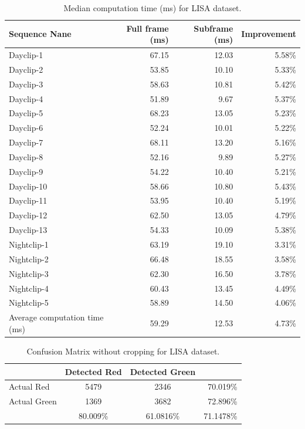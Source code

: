 \begin{table}[!ht]
  \centering
  \caption{Median computation time (ms) for LISA dataset.}
  \label{t:lisa_time}
  \begin{tabular}{  l   r   r  r}
    \rowcolor{gray!50}
    Sequence Nane &  Full frame (ms)  &  Subframe (ms) & Improvement \\
    \hline
    Dayclip-1 & 67.15 & 12.03 & 5.58\% \\
    Dayclip-2 & 53.85 & 10.10 & 5.33\% \\
    Dayclip-3 & 58.63 & 10.81 & 5.42\% \\
    Dayclip-4 & 51.89 & 9.67 & 5.37\% \\
    Dayclip-5 & 68.23 & 13.05 & 5.23\% \\
    Dayclip-6 & 52.24 & 10.01 & 5.22\% \\
    Dayclip-7 & 68.11  & 13.20 & 5.16\% \\
    Dayclip-8 & 52.16  & 9.89  & 5.27\% \\
    Dayclip-9 & 54.22  & 10.40  & 5.21\% \\
    Dayclip-10 & 58.66 & 10.80 & 5.43\% \\
    Dayclip-11 & 53.95 & 10.40 & 5.19\% \\
    Dayclip-12 & 62.50  & 13.05 & 4.79\% \\
    Dayclip-13 & 54.33 & 10.09 & 5.38\% \\
    Nightclip-1 & 63.19 & 19.10 & 3.31\% \\
    Nightclip-2 & 66.48 & 18.55 & 3.58\% \\
    Nightclip-3 & 62.30 & 16.50 & 3.78\% \\
    Nightclip-4 & 60.43 & 13.45 & 4.49\% \\
    Nightclip-5 & 58.89 & 14.50 & 4.06\% \\
    \hline
    Average computation time (ms) & 59.29 & 12.53 & 4.73\% \\
    
  \end{tabular}
\end{table}

\begin{table}[h!]
  \centering
  \caption{Confusion Matrix without cropping for LISA dataset.}
  \label{t:con_nocrp}
  \begin{tabular}{  l | c | c | r }
   
     & Detected Red & Detected Green &  \\
    \hline
    Actual Red & 5479 & 2346 & 70.019\% \\
    \hline
    Actual Green & 1369 & 3682 & 72.896\% \\
    \hline
    & 80.009\% & 61.0816\% & 71.1478\% \\
    
  \end{tabular}
\end{table}

